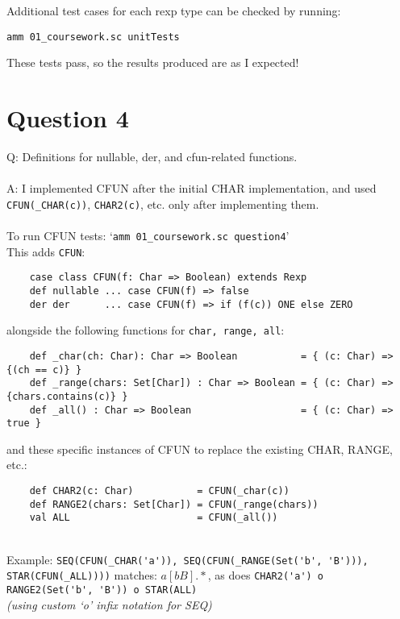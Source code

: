 \documentclass[english]{scrartcl}
\begin{document}
Additional test cases for each rexp type can be checked by running:
\begin{center}
    \verb|amm 01_coursework.sc unitTests|
\end{center}

These tests pass, so the results produced are as I expected!

\section*{Question 4}
Q: Definitions for nullable, der, and cfun-related functions.
\\
\\
A: I implemented CFUN after the initial CHAR implementation, and used \verb|CFUN(_CHAR(c))|, \verb|CHAR2(c)|, etc. only after implementing them.\\
\\
To run CFUN tests: `\verb|amm 01_coursework.sc question4|' \\
This adds \verb|CFUN|:
\begin{verbatim}
    case class CFUN(f: Char => Boolean) extends Rexp
    def nullable ... case CFUN(f) => false
    der der      ... case CFUN(f) => if (f(c)) ONE else ZERO
\end{verbatim}
alongside the following functions for \verb|char, range, all|:
\begin{verbatim}
    def _char(ch: Char): Char => Boolean           = { (c: Char) => {(ch == c)} }
    def _range(chars: Set[Char]) : Char => Boolean = { (c: Char) => {chars.contains(c)} }
    def _all() : Char => Boolean                   = { (c: Char) => true }
\end{verbatim}
and these specific instances of CFUN to replace the existing CHAR, RANGE, etc.:
\begin{verbatim}
    def CHAR2(c: Char)           = CFUN(_char(c))
    def RANGE2(chars: Set[Char]) = CFUN(_range(chars))
    val ALL                      = CFUN(_all())
\end{verbatim}

\mbox{}\\
Example: \verb|SEQ(CFUN(_CHAR('a')), SEQ(CFUN(_RANGE(Set('b', 'B'))), STAR(CFUN(_ALL))))|
matches: $a[bB].*$, as does \verb|CHAR2('a') o RANGE2(Set('b', 'B')) o STAR(ALL)| \\
\textit{(using custom `o' infix notation for SEQ)}

\end{document}
